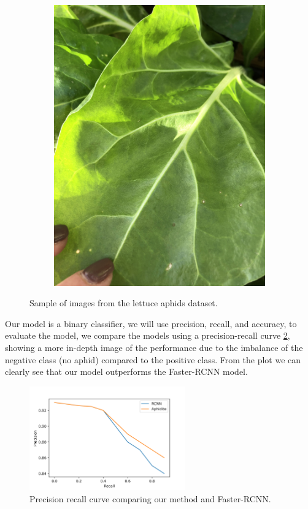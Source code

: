 \documentclass{article}
\begin{document}
\begin{figure}
\begin{subfigure}{0.4\textwidth}
        \includegraphics[width=\textwidth]{images/ds4.jpg}
    \end{subfigure}
    \caption{Sample of images from the lettuce aphids dataset.}
    \label{fig:dataset}
\end{figure}

Our model is a binary classifier, we will use precision, recall, and accuracy, to evaluate the model, we compare the models using a precision-recall curve \ref{fig:pr_curve},
showing a more in-depth image of the performance due to the imbalance of the negative class (no aphid) compared to the positive class.
From the plot we can clearly see that our model outperforms the Faster-RCNN model.

\begin{figure}
    \centering
    \includegraphics[width=0.6\textwidth]{images/pr_curve.png}
    \caption{Precision recall curve comparing our method and Faster-RCNN.}
    \label{fig:pr_curve}
\end{figure}
\end{document}

